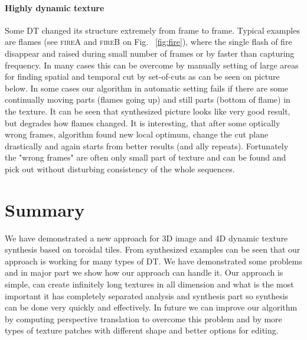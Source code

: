 \paragraph{Highly dynamic texture}
	Some DT changed its structure extremely from frame to frame. Typical examples are flames (see \textsc{fireA} and \textsc{fireB} on Fig. ~\ref{fig:fire}), where the single flash of fire disappear and raised during small number of frames or by faster than capturing frequency. In many cases this can be overcome by manually setting of large areas for finding spatial and temporal cut by set-of-cuts as can be seen on picture below. In some cases our algorithm in automatic setting fails if there are some continually moving parts (flames going up) and still parts (bottom of flame) in the texture. It can be seen that synthesized picture looks like very good result, but degrades how flames changed. It is interesting, that after some optically wrong frames, algorithm found new local optimum, change the cut plane drastically and again starts from better results (and ally repeats). Fortunately the "wrong frames" are often only small part of texture and can be found and pick out without disturbing consistency of the whole sequences.

%

		
		
		\section {Summary}
		
		We have demonstrated a new approach for 3D image and 4D dynamic texture synthesis based on toroidal tiles. From synthesized examples can be seen that our approach is working for many types of DT. We have demonstrated some problems and in major part we show how our approach can handle it. Our approach is simple, can create infinitely long textures in all dimension and what is the most important it has completely separated analysis and synthesis part so synthesis can be done very quickly and effectively. In future we can improve our algorithm by computing perspective translation to overcome this problem and by more types of texture patches with different shape and better options for editing.


